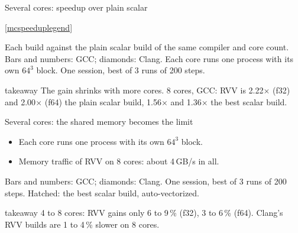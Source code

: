 \documentclass[aspectratio=169,10pt,t]{beamer}
\newcommand{\sx}[1]{#1\ensuremath{\times}} %
\newcommand{\takeaway}[1]{\par\vfill
  \begin{beamercolorbox}[wd=\textwidth,sep=4pt,rounded=true]{takeaway}
    \small #1
  \end{beamercolorbox}}
\begin{document}
\begin{frame}{Several cores: speedup over plain scalar}
  \vspace{1mm}
  \centering\hspace{0.6cm}

  \vspace{0.5mm}
  \ref{mcspeeduplegend}

  \vspace{1mm}
  {\scriptsize\color{psgray}Each build against the plain scalar build of the same compiler and core
  count. Bars and numbers: GCC; diamonds: Clang. Each core runs one process with its own $64^3$ block.
  One session, best of 3 runs of 200 steps.\par}
  \takeaway{The gain shrinks with more cores. 8 cores, GCC: RVV is \sx{2.22} (f32) and \sx{2.00}
    (f64) the plain scalar build, \sx{1.56} and \sx{1.36} the best scalar build.}
\end{frame}

\begin{frame}{Several cores: the shared memory becomes the limit}
  \vspace{1mm}
  \centering

  \vspace{1mm}
  \raggedright
  \begin{itemize}\small
    \item Each core runs one process with its own $64^3$ block.
    \item Memory traffic of RVV on 8 cores: about 4\,GB/s in all.
  \end{itemize}
  {\scriptsize\color{psgray}Bars and numbers: GCC; diamonds: Clang. One session, best of 3 runs of
  200 steps. Hatched: the best scalar build, auto-vectorized.\par}
  \takeaway{4 to 8 cores: RVV gains only 6 to 9\,\% (f32), 3 to 6\,\% (f64). Clang's RVV builds are
    1 to 4\,\% slower on 8 cores.}
\end{frame}
\end{document}
